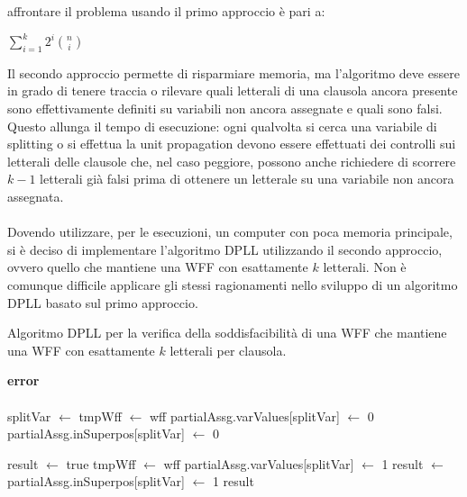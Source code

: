 affrontare il problema usando il primo approccio è pari a:
\begin{center}
    $\sum_{i=1}^{k} 2^i \binom{n}{i}$
\end{center}
Il secondo approccio permette di risparmiare memoria, ma l'algoritmo deve essere in grado
di tenere traccia o rilevare quali letterali di una clausola ancora presente sono
effettivamente definiti su variabili non ancora assegnate e quali sono falsi.
Questo allunga il tempo di esecuzione: ogni qualvolta si cerca una variabile di splitting
o si effettua la unit propagation devono essere effettuati dei controlli sui
letterali delle clausole che, nel caso peggiore, possono anche richiedere di scorrere
$k-1$ letterali già falsi prima di ottenere un letterale su una variabile non ancora
assegnata.\\
\\
Dovendo utilizzare, per le esecuzioni, un computer con poca memoria principale, si è deciso di implementare l'algoritmo DPLL utilizzando il secondo approccio, ovvero quello che mantiene una WFF con esattamente $k$ letterali.
Non è comunque difficile applicare gli stessi ragionamenti nello sviluppo di un algoritmo DPLL basato sul primo approccio.

\begin{algorithm}[H]
    \caption{Algoritmo DPLL per la verifica della soddisfacibilità di una WFF che mantiene una WFF con esattamente $k$ letterali per clausola.}
    \label{alg:dpll_second_approach}
    \begin{algorithmic}[1]
                \State \textbf{error}
            \EndIf\\
        
                \State \Return {}
            \EndIf
                \State \Return {}
            \EndIf\\

            \State splitVar $\gets$ 
            \State tmpWff $\gets$ wff
            \State partialAssg.varValues[splitVar] $\gets$ 0
            \State partialAssg.inSuperpos[splitVar] $\gets$ 0
            \State {}
                
                \State result $\gets$ true
            \Else
                \State tmpWff $\gets$ wff
                \State partialAssg.varValues[splitVar] $\gets$ 1
                \State {}
                \State result $\gets$ 
            \EndIf
            \State partialAssg.inSuperpos[splitVar] $\gets$ 1
            \State \Return result
        \EndProcedure
    \end{algorithmic}
\end{algorithm}

